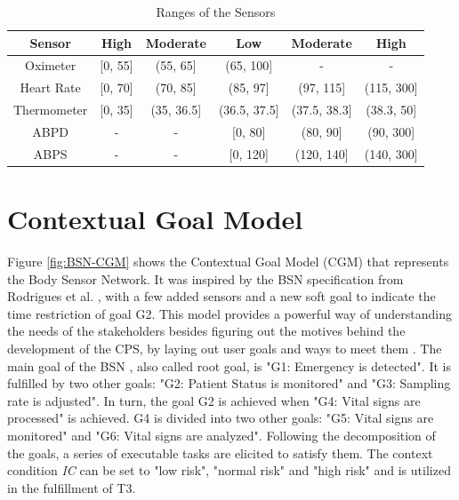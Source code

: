 \begin{table}[!h]
	\centering
	\begin{tabular}{cccccc}
		\hline
		\textbf{Sensor}                  & \textbf{High}                    & \textbf{Moderate}                 & \textbf{Low}                        & \textbf{Moderate}                   & \textbf{High} \\ \hline
		\multicolumn{1}{c|}{Oximeter}    & \multicolumn{1}{c|}{{[}0, 55{]}} & \multicolumn{1}{c|}{(55, 65{]}}   & \multicolumn{1}{c|}{(65, 100{]}}    & \multicolumn{1}{c|}{-}              & -             \\ \hline
		\multicolumn{1}{c|}{Heart Rate}  & \multicolumn{1}{c|}{{[}0, 70{]}} & \multicolumn{1}{c|}{(70, 85{]}}   & \multicolumn{1}{c|}{(85, 97{]}}     & \multicolumn{1}{c|}{(97, 115{]}}    & (115, 300{]}  \\ \hline
		\multicolumn{1}{c|}{Thermometer} & \multicolumn{1}{c|}{{[}0, 35{]}} & \multicolumn{1}{c|}{(35, 36.5{]}} & \multicolumn{1}{c|}{(36.5, 37.5{]}} & \multicolumn{1}{c|}{(37.5, 38.3{]}} & (38.3, 50{]}  \\ \hline
		\multicolumn{1}{c|}{ABPD}        & \multicolumn{1}{c|}{-}           & \multicolumn{1}{c|}{-}            & \multicolumn{1}{c|}{{[}0, 80{]}}    & \multicolumn{1}{c|}{(80, 90{]}}     & (90, 300{]}   \\ \hline
		\multicolumn{1}{c|}{ABPS}        & \multicolumn{1}{c|}{-}           & \multicolumn{1}{c|}{-}            & \multicolumn{1}{c|}{{[}0, 120{]}}   & \multicolumn{1}{c|}{(120, 140{]}}   & (140, 300{]} 
	\end{tabular}
	\label{tab:sensor_ranges}
	\caption{Ranges of the Sensors}
\end{table}

\section{Contextual Goal Model}

Figure \ref{fig:BSN-CGM} shows the Contextual Goal Model (CGM) that represents the Body Sensor Network. It was inspired by the BSN specification from Rodrigues et al. \cite{seams2018}, with a few added sensors and a new soft goal to indicate the time restriction of goal G2. This model provides a powerful way of understanding the needs of the stakeholders besides figuring out the motives behind the development of the CPS, by laying out user goals and ways to meet them \cite{ali_goal_based_2010}. The main goal of the BSN \cite{pessoa2017building}, also called root goal, is "G1: Emergency is detected". It is fulfilled by two other goals: "G2: Patient Status is monitored" and "G3: Sampling rate is adjusted". In turn, the goal G2 is achieved when "G4: Vital signs are processed" is achieved. G4 is divided into two other goals: "G5: Vital signs are monitored" and "G6: Vital signs are analyzed". Following the decomposition of the goals, a series of executable tasks are elicited to satisfy them. The context condition \textit{IC} can be set to "low risk", "normal risk" and "high risk" and is utilized in the fulfillment of T3.

